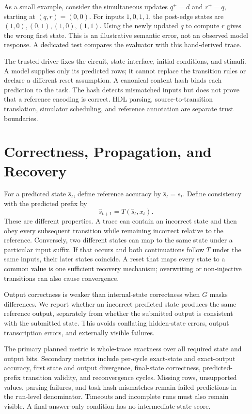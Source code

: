 \documentclass[conference,10pt]{IEEEtran}
\begin{document}
As a small example, consider the simultaneous updates $q^+=d$ and $r^+=q$, starting at $(q,r)=(0,0)$. For inputs $1,0,1,1$, the post-edge states are $(1,0),(0,1),(1,0),(1,1)$. Using the newly updated $q$ to compute $r$ gives the wrong first state. This is an illustrative semantic error, not an observed model response. A dedicated test compares the evaluator with this hand-derived trace.

The trusted driver fixes the circuit, state interface, initial conditions, and stimuli. A model supplies only its predicted rows; it cannot replace the transition rules or declare a different reset assumption. A canonical content hash binds each prediction to the task. The hash detects mismatched inputs but does not prove that a reference encoding is correct. HDL parsing, source-to-transition translation, simulator scheduling, and reference annotation are separate trust boundaries.

\section{Correctness, Propagation, and Recovery}
For a predicted state $\hat{s}_t$, define reference accuracy by $\hat{s}_t=s_t$. Define consistency with the predicted prefix by
\begin{equation}
\hat{s}_{t+1}=T(\hat{s}_t,x_t).
\end{equation}
These are different properties. A trace can contain an incorrect state and then obey every subsequent transition while remaining incorrect relative to the reference. Conversely, two different states can map to the same state under a particular input suffix. If that occurs and both continuations follow $T$ under the same inputs, their later states coincide. A reset that maps every state to a common value is one sufficient recovery mechanism; overwriting or non-injective transitions can also cause convergence.

Output correctness is weaker than internal-state correctness when $G$ masks differences. We report whether an incorrect predicted state produces the same reference output, separately from whether the submitted output is consistent with the submitted state. This avoids conflating hidden-state errors, output transcription errors, and externally visible failures.

The primary planned metric is whole-trace exactness over all required state and output bits. Secondary metrics include per-cycle exact-state and exact-output accuracy, first state and output divergence, final-state correctness, predicted-prefix transition validity, and reconvergence cycles. Missing rows, unsupported values, parsing failures, and task-hash mismatches remain failed predictions in the run-level denominator. Timeouts and incomplete runs must also remain visible. A final-answer-only condition has no intermediate-state score.
\end{document}

